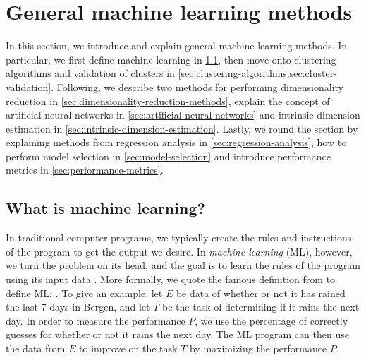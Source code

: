 \section{General machine learning methods}
In this section, we introduce and explain general machine learning methods. In particular, we first define machine learning in \cref{sec:what-is-machine-learning}, then move onto clustering algorithms and validation of clusters in \cref{sec:clustering-algorithms,sec:cluster-validation}. Following, we describe two methods for performing dimensionality reduction in \cref{sec:dimensionality-reduction-methods}, explain the concept of artificial neural networks in \cref{sec:artificial-neural-networks} and intrinsic dimension estimation in \cref{sec:intrinsic-dimension-estimation}. Lastly, we round the section by explaining methods from regression analysis in \cref{sec:regression-analysis}, how to perform model selection in \cref{sec:model-selection} and introduce performance metrics in \cref{sec:performance-metrics}.

\subsection{What is machine learning?}
\label{sec:what-is-machine-learning}
In traditional computer programs, we typically create the rules and instructions of the program to get the output we desire. In \textit{machine learning} (ML), however, we turn the problem on its head, and the goal is to learn the rules of the program using its input data \cite{Mitchell1997}. More formally, we quote the famous definition from \cite[p. 2]{Mitchell1997} to define ML: . To give an example, let $E$ be data of whether or not it has rained the last 7 days in Bergen, and let $T$ be the task of determining if it rains the next day. In order to measure the performance $P$, we use the percentage of correctly guesses for whether or not it rains the next day. The ML program can then use the data from $E$ to improve on the task $T$ by maximizing the performance $P$.


